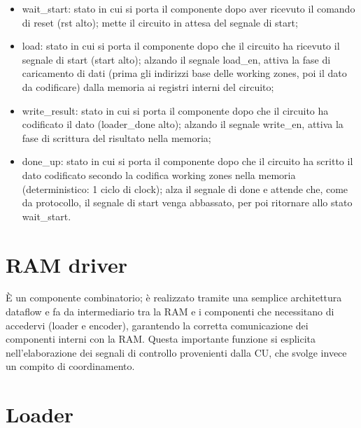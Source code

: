 \documentclass[10pt,english, openany]{book}
\begin{document}
\begin{itemize}
  \item wait\_start: stato in cui si porta il componente dopo aver ricevuto il        comando di reset (rst alto); mette il circuito in attesa del segnale di       start;
  \item load: stato in cui si porta il componente dopo che il circuito ha             ricevuto il segnale di start (start alto); alzando il segnale load\_en, attiva la fase di caricamento       di dati (prima gli indirizzi base delle working zones, poi il dato da         codificare) dalla memoria ai registri interni del circuito;
  \item write\_result: stato in cui si porta il componente dopo che il circuito       ha codificato il dato (loader\_done alto); alzando il segnale write\_en, attiva la fase di scrittura del risultato nella        memoria;
  \item done\_up: stato in cui si porta il componente dopo che il circuito ha         scritto il dato codificato secondo la codifica working zones nella            memoria (deterministico: 1 ciclo di clock); alza il segnale di done e attende che, come da protocollo, il        segnale di start venga abbassato, per poi ritornare allo stato                wait\_start.
\end{itemize}

\section{RAM driver}

È un componente combinatorio; è realizzato tramite una semplice architettura dataflow e fa da intermediario tra la RAM e i componenti che necessitano di accedervi (loader e encoder), garantendo la corretta comunicazione dei componenti interni con la RAM. Questa importante funzione si esplicita nell’elaborazione dei segnali di controllo provenienti dalla CU, che svolge invece un compito di coordinamento.

\section{Loader}
\end{document}
